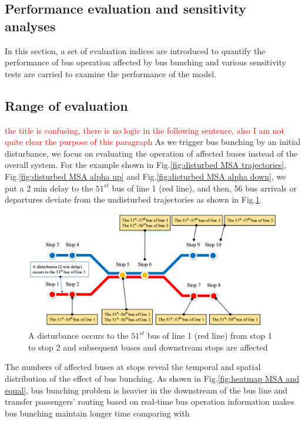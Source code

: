 \documentclass[smallextended]{svjour3}       %
\begin{document}
\begin{Abstract}
\section{Performance evaluation and sensitivity analyses}\label{Evaluation and sensitivity analyses}
In this section, a set of evaluation indices are introduced to quantify the performance of bus operation affected by bus bunching and various sensitivity tests are carried to examine the performance of the model. 
\subsection{Range of evaluation}
\textcolor{red}{the title is confusing, there is no logic in the following sentence, 
also I am not quite clear the purpose of this paragraph}
As we trigger bus bunching by an initial disturbance, 
we focus on evaluating the operation of affected buses instead of the overall system.
For the example shown in Fig.\ref{fig:disturbed MSA trajectories}, Fig.\ref{fig:disturbed MSA alpha up} and Fig.\ref{fig:disturbed MSA alpha down}, 
we put a 2 min delay to the $51^{st}$ bus of line 1 (red line), 
and then, 56 bus arrivals or departures deviate from the undisturbed trajectories
as shown in Fig.\ref{fig:range}. 
\begin{figure}[H]
    \centering
    \includegraphics[width=0.9\linewidth]{CASPT2021paper_fig/range.png}
    \caption{A disturbance occurs to the $51^{st}$ bus of line 1 (red line) from stop 1 to stop 2 and subsequent buses and downstream stops are affected}
    \label{fig:range}
\end{figure}
The numbers of affected buses at stops reveal the temporal and spatial distribution of the effect of bus bunching.
As shown in Fig.\ref{fig:heatmap MSA and equal}, bus bunching problem is heavier in the downstream of the bus line and transfer passengers' routing based on real-time bus operation information makes bus bunching maintain longer time comparing with 

\end{Abstract}
\end{document}
